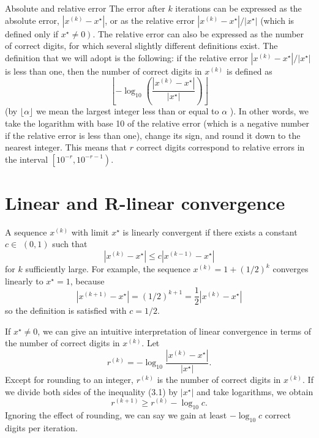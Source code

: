 Absolute and relative error The error after $ k $ iterations can be expressed as the absolute error, $ \left|x^{(k)}-x^{\star}\right| $, or as the relative error $ \left|x^{(k)}-x^{\star}\right| /\left|x^{\star}\right| $ (which is defined only if $ \left.x^{\star} \neq 0\right) $. The relative error can also be expressed as the number of correct digits, for which several slightly different definitions exist. The definition that we will adopt is the following: if the relative error $ \left|x^{(k)}-x^{\star}\right| /\left|x^{\star}\right| $ is less than one, then the number of correct digits in $ x^{(k)} $ is defined as
\begin{equation}
\left\lfloor-\log _{10}\left(\frac{\left|x^{(k)}-x^{\star}\right|}{\left|x^{\star}\right|}\right)\right\rfloor
\end{equation}
(by $ \lfloor\alpha\rfloor $ we mean the largest integer less than or equal to $ \alpha $ ). In other words, we take the logarithm with base 10 of the relative error (which is a negative number if the relative error is less than one), change its sign, and round it down to the nearest integer. This means that $ r $ correct digits correspond to relative errors in the interval $ \left[10^{-r}, 10^{-r-1}\right) $.

\section{ Linear and R-linear convergence}

A sequence $ x^{(k)} $ with limit $ x^{\star} $ is linearly convergent if there exists a constant $ c \in $ $ (0,1) $ such that
\begin{equation}
\left|x^{(k)}-x^{\star}\right| \leq c\left|x^{(k-1)}-x^{\star}\right|
\end{equation}
for $ k $ sufficiently large. For example, the sequence $ x^{(k)}=1+(1 / 2)^{k} $ converges linearly to $ x^{\star}=1 $, because
\begin{equation}
\left|x^{(k+1)}-x^{\star}\right|=(1 / 2)^{k+1}=\frac{1}{2}\left|x^{(k)}-x^{\star}\right|
\end{equation}
so the definition is satisfied with $ c=1 / 2 $.

If $ x^{\star} \neq 0 $, we can give an intuitive interpretation of linear convergence in terms of the number of correct digits in $ x^{(k)} $. Let
\begin{equation}
r^{(k)}=-\log _{10} \frac{\left|x^{(k)}-x^{\star}\right|}{\left|x^{\star}\right|} .
\end{equation}
Except for rounding to an integer, $ r^{(k)} $ is the number of correct digits in $ x^{(k)} $. If we divide both sides of the inequality (3.1) by $ \left|x^{\star}\right| $ and take logarithms, we obtain
\begin{equation}
r^{(k+1)} \geq r^{(k)}-\log _{10} c .
\end{equation}
Ignoring the effect of rounding, we can say we gain at least $ -\log _{10} c $ correct digits per iteration.

